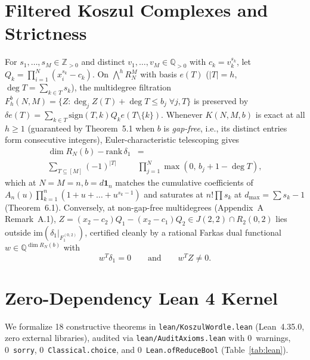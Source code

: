 \documentclass[11pt,twocolumn]{article}
\newcommand{\ZZ}{\mathbb{Z}}
\newcommand{\QQ}{\mathbb{Q}}
\begin{document}
\section{Filtered Koszul Complexes and Strictness}\label{sec:prelim}
For $s_1,\dots,s_M \in \ZZ_{>0}$ and distinct $v_1,\dots,v_M \in \QQ_{>0}$ with $c_k = v_k^{s_k}$, let $Q_k = \prod_{i=1}^N (x_i^{s_k} - c_k)$. On $\bigwedge^h R_N^M$ with basis $e(T)$ ($|T|=h$, $\deg T = \sum_{k\in T} s_k$), the multidegree filtration $F_h^b(N,M) = \{Z : \deg_j Z(T) + \deg T \le b_j\;\forall j,T\}$ is preserved by $\delta e(T) = \sum_{k\in T} \mathrm{sign}(T,k) Q_k e(T\setminus\{k\})$. Whenever $K(N,M,b)$ is exact at all $h \ge 1$ (guaranteed by Theorem~5.1 when $b$ is \emph{gap-free}, i.e., its distinct entries form consecutive integers), Euler-characteristic telescoping gives
\begin{equation}
\begin{aligned}
  \dim R_N(b) - \mathrm{rank}\,\delta_1 &= \\
  \sum_{T \subseteq [M]} (-1)^{|T|} &\prod_{j=1}^N \max(0,\, b_j + 1 - \deg T),
\end{aligned}
  \label{eq:euler}
\end{equation}
which at $N=M=n, b=d\mathbf{1}_n$ matches the cumulative coefficients of $A_n(u)\prod_{k=1}^n (1+u+\dots+u^{s_k-1})$ and saturates at $n!\prod s_k$ at $d_{\max} = \sum s_k - 1$ (Theorem~6.1). Conversely, at non-gap-free multidegrees (Appendix~A Remark~A.1), $Z = (x_2 - c_2)Q_1 - (x_2 - c_1)Q_2 \in J(2,2) \cap R_2(0,2)$ lies outside $\mathrm{im}(\delta_1|_{F_1^{(0,2)}})$, certified cleanly by a rational Farkas dual functional $w \in \QQ^{\dim R_N(b)}$ with
\begin{equation}
  w^T \delta_1 = 0 \qquad \text{and} \qquad w^T Z \neq 0.
  \label{eq:farkas}
\end{equation}

\section{Zero-Dependency Lean 4 Kernel}\label{sec:lean}
We formalize 18 constructive theorems in \texttt{lean/KoszulWordle.lean} (Lean~4.35.0, zero external libraries), audited via \texttt{lean/AuditAxioms.lean} with 0~warnings, 0~\texttt{sorry}, 0~\texttt{Classical.choice}, and 0~\texttt{Lean.ofReduceBool} (Table~\ref{tab:lean}).
\end{document}
